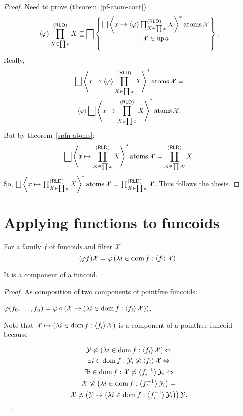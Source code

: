 \begin{proof}
  Need to prove (theorem~\ref{pf-atom-cont})
  \[ \supfun{\varphi} \prod^{\reloids}_{X \in \prod a} X \sqsubseteq \bigsqcap
     \setcond{\bigsqcup \rsupfun{x \mapsto \supfun{\varphi}
     \prod^{\reloids}_{X \in \prod x} X} \atoms \mathcal{X}}{\mathcal{X} \in
     \up a} . \]
  Really,
\begin{multline*}
\bigsqcup \rsupfun{x \mapsto \supfun{\varphi} \prod^{\reloids}_{X \in
     \prod x} X} \atoms \mathcal{X} =\\ \supfun{\varphi} \bigsqcup \rsupfun{x
     \mapsto \prod^{\reloids}_{X \in \prod x} X} \atoms \mathcal{X} .
\end{multline*}
  But by theorem~\ref{spfn-atoms}:
  \[ \bigsqcup \rsupfun{x \mapsto \prod^{\reloids}_{X \in \prod x} X}
     \atoms \mathcal{X} = \prod^{\reloids}_{X \in \prod \mathcal{X}}
     X . \]
  So, $\bigsqcup \rsupfun{x \mapsto \prod^{\reloids}_{X \in \prod a} X}
  \atoms \mathcal{X} \sqsupseteq \prod^{\reloids}_{X \in \prod a}
  \mathcal{X}$. Thus follows the thesis.
\end{proof}

\section{Applying functions to funcoids}

\begin{defn}
For a family $f$ of funcoids and filter
  $\mathcal{X}$
\[(\varphi f) \mathcal{X} = \varphi \left( \lambda i \in \operatorname{dom} f :
  \left\langle f_i\right\rangle \mathcal{X} \right) .\]
\end{defn}

\begin{prop}
  It is a component of a funcoid.
\end{prop}

\begin{proof}
  As composition of two components of pointfree funcoids:
  
  $\varphi (f_0, \ldots, f_n) = \varphi \circ \left( \mathcal{X} \mapsto
  \left( \lambda i \in \operatorname{dom} f : \left\langle f_i\right\rangle \mathcal{X} \right)
  \right)$.
  
  Note that $\mathcal{X} \mapsto \left( \lambda i \in \operatorname{dom} f :
  \left\langle f_i\right\rangle \mathcal{X} \right)$ is a component of a pointfree funcoid because
  
\begin{multline*}
  \mathcal{Y} \not\asymp \left( \lambda i \in \operatorname{dom} f : \left\langle f_i\right\rangle
  \mathcal{X} \right) \Leftrightarrow\\ \exists i \in \operatorname{dom} f :
  \mathcal{Y}_i \not\asymp \left\langle f_i\right\rangle \mathcal{X} \Leftrightarrow\\ \exists i \in
  \operatorname{dom} f : \mathcal{X} \not\asymp \left\langle f_i^{- 1}\right\rangle \mathcal{Y}_i
  \Leftrightarrow\\ \mathcal{X} \not\asymp \left( \lambda i \in \operatorname{dom} f :
  \left\langle f_i^{- 1}\right\rangle \mathcal{Y}_i \right) =\\ \mathcal{X} \not\asymp \left(
  \mathcal{Y} \mapsto \left( \lambda i \in \operatorname{dom} f : \left\langle f_i^{- 1}\right\rangle
  \mathcal{Y}_i \right) \right) \mathcal{Y}.
\end{multline*}
\end{proof}

